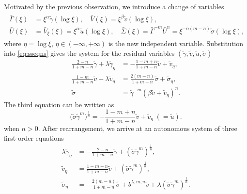 \documentclass[a4paper,11pt]{article}
\def\bG{\bar{\Gamma}}
\def\bS{\bar{\Sigma}}
\def\bV{\bar{V}}
\def\bU{\bar{U}}
\def\tg{\tilde{\gamma}}
\def\ts{\tilde{\sigma}}
\def\tv{\tilde{v}}
\def\tu{\tilde{u}}
\numberwithin{step}{dummy}
\begin{document}
Motivated by the previous observation, we introduce a change of variables
\begin{align} \label{eq:tvars}
 \begin{aligned}
 \bG(\xi) &= \xi^\alpha \tg(\log \xi), \quad \bV(\xi) = \xi^\beta \tv(\log \xi), \\
 \bU(\xi) &= \bV_\xi(\xi) = \xi^\alpha \tu(\log\xi), \quad \bS(\xi) =\bG^{-m}\bU^n= \xi^{-\alpha(m-n)}\ts(\log\xi),
 \end{aligned}
\end{align}
where $\eta = \log \xi$, $\eta \in (-\infty,+\infty)$ is the new independent variable.
Substitution into \eqref{eq:sseqns} gives the system for the residual variables $(\tg,\tv,\tu,\ts)$
\begin{equation}
 \begin{split}
 \frac{2-n}{1+m-n} \tg + \lambda \tg_\eta &= - \frac{1-m+n}{1+m-n}\tv + \tv_\eta,\\
 \frac{1-m}{1+m-n} \tv + \lambda \tv_\eta &= \frac{2(m-n)}{1+m-n}\ts + \ts_\eta,\\
 \ts &=\tg^{-m}(\beta \tv + \tv_\eta)^n. %
 \end{split}
\end{equation}
The third equation can be written as
$$\big(\ts \tg^m\big)^\frac{1}{n} = - \frac{1-m+n}{1+m-n}\tv + \tv_\eta\;(=\tu).$$
when $n>0$.
After rearrangement, we arrive at an autonomous system of three first-order equations
\begin{equation} \label{eq:auto0}
 \begin{split}
  \lambda \tg_\eta &= -\frac{2-n}{1+m-n}\tg + (\ts \tg^m)^{ \frac{1}{n} }, \\
  \tv_\eta &= \frac{1-m+n}{1+m-n}\tv + (\ts \tg^m)^{ \frac{1}{n} }, \\
  \ts_\eta &= - \frac{2(m-n)}{1+m-n}\ts + b^{ \lambda,m,n}\tv + \lambda(\ts \tg^m)^{ \frac{1}{n} }.
 \end{split}
\end{equation}
\end{document}

